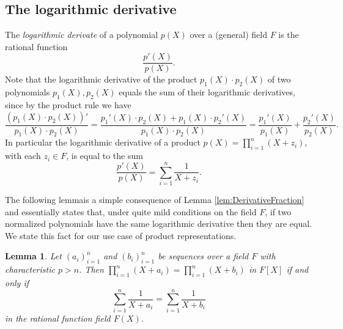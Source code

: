 \documentclass[11pt]{article}
\newtheorem{lem}[]{Lemma}
\theoremstyle{definition}
\theoremstyle{definition}
\begin{document}
\subsection{The  logarithmic derivative}

The \textit{logarithmic derivate} of a polynomial $p(X)$ over a (general) field $F$ is the rational function
\begin{equation*}
\frac{p'(X)}{p(X)}.
\end{equation*}
Note that the logarithmic derivative of the product $p_1(X)\cdot p_2(X)$ of two polynomials $p_1(X), p_2(X)$ equals the sum of their logarithmic derivatives, since by the product rule we have 
\[
\frac{(p_1(X)\cdot p_2(X))'}{p_1(X)\cdot p_2(X)} = \frac{p_1'(X)\cdot p_2(X) + p_1(X)\cdot p_2'(X)}{p_1(X)\cdot p_2(X)} 
= \frac{p_1'(X)}{p_1(X)} + \frac{p_2'(X)}{p_2(X)}.
\]
In particular the logarithmic derivative of a product $p(X) = \prod_{i=1}^n (X + z_i)$, with each $z_i\in F$, is equal to the sum
\begin{equation}
\label{e:LogDerivativeProduct}
\frac{p'(X)}{p(X)} %
= \sum_{i=1}^n \frac{1}{X + z_i}.
\end{equation}

The following lemma\footnotemark is a simple consequence of Lemma \ref{lem:DerivativeFraction} and essentially states that, under quite mild conditions on the field $F$, if two normalized polynomials have the same logarithmic derivative then they are equal. 
We state this fact for our use case of product representations.
%
\begin{lem}
\label{lem:LogarithmicDerivative}
Let $(a_i)_{i=1}^n$ and $(b_i)_{i=1}^n$ be sequences  over a field $F$ with characteristic $p > n$. 
Then
$
\prod_{i=1}^n \left(X + a_i \right) =\prod_{i=1}^n \left(X + b_i \right)
$
in $F[X]$ if and only if  
\begin{equation*}
\sum_{i=1}^n \frac{1}{X + a_i} =\sum_{i=1} ^n\frac{1}{X + b_i}
\end{equation*}
in the rational function field $F(X)$.
\end{lem}
\end{document}
